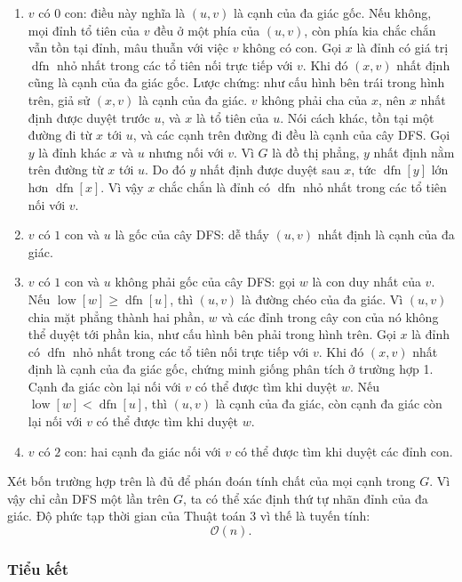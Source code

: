 \documentclass[11pt]{article}
\newcommand{\Oh}{\mathcal{O}}
\newcommand{\dfn}{\operatorname{dfn}}
\newcommand{\low}{\operatorname{low}}
\begin{document}
\begin{enumerate}
  \item \(v\) có \(0\) con: điều này nghĩa là \((u,v)\) là cạnh của đa giác
  gốc. Nếu không, mọi đỉnh tổ tiên của \(v\) đều ở một phía của \((u,v)\), còn
  phía kia chắc chắn vẫn tồn tại đỉnh, mâu thuẫn với việc \(v\) không có con.
  Gọi \(x\) là đỉnh có giá trị \(\dfn\) nhỏ nhất trong các tổ tiên nối trực
  tiếp với \(v\). Khi đó \((x,v)\) nhất định cũng là cạnh của đa giác gốc. Lược
  chứng: như cấu hình bên trái trong hình trên, giả sử \((x,v)\) là cạnh của đa giác. \(v\) không phải
  cha của \(x\), nên \(x\) nhất định được duyệt trước \(u\), và \(x\) là tổ
  tiên của \(u\). Nói cách khác, tồn tại một đường đi từ \(x\) tới \(u\), và
  các cạnh trên đường đi đều là cạnh của cây DFS. Gọi \(y\) là đỉnh khác \(x\)
  và \(u\) nhưng nối với \(v\). Vì \(G\) là đồ thị phẳng, \(y\) nhất định nằm
  trên đường từ \(x\) tới \(u\). Do đó \(y\) nhất định được duyệt sau \(x\),
  tức \(\dfn[y]\) lớn hơn \(\dfn[x]\). Vì vậy \(x\) chắc chắn là đỉnh có
  \(\dfn\) nhỏ nhất trong các tổ tiên nối với \(v\).
  \item \(v\) có \(1\) con và \(u\) là gốc của cây DFS: dễ thấy \((u,v)\) nhất
  định là cạnh của đa giác.
  \item \(v\) có \(1\) con và \(u\) không phải gốc của cây DFS: gọi \(w\) là
  con duy nhất của \(v\). Nếu \(\low[w]\ge \dfn[u]\), thì \((u,v)\) là đường
  chéo của đa giác. Vì \((u,v)\) chia mặt phẳng thành hai phần, \(w\) và các
  đỉnh trong cây con của nó không thể duyệt tới phần kia, như cấu hình bên
  phải trong hình trên. Gọi \(x\) là đỉnh có \(\dfn\) nhỏ nhất trong các tổ tiên nối trực tiếp với \(v\).
  Khi đó \((x,v)\) nhất định là cạnh của đa giác gốc, chứng minh giống phân
  tích ở trường hợp 1. Cạnh đa giác còn lại nối với \(v\) có thể được tìm khi
  duyệt \(w\). Nếu \(\low[w]<\dfn[u]\), thì \((u,v)\) là cạnh của đa giác, còn
  cạnh đa giác còn lại nối với \(v\) có thể được tìm khi duyệt \(w\).
  \item \(v\) có \(2\) con: hai cạnh đa giác nối với \(v\) có thể được tìm khi
  duyệt các đỉnh con.
\end{enumerate}

Xét bốn trường hợp trên là đủ để phán đoán tính chất của mọi cạnh trong \(G\).
Vì vậy chỉ cần DFS một lần trên \(G\), ta có thể xác định thứ tự nhãn đỉnh của
đa giác. Độ phức tạp thời gian của Thuật toán 3 vì thế là tuyến tính:
\[
  \Oh(n).
\]

\subsubsection{Tiểu kết}
\end{document}
